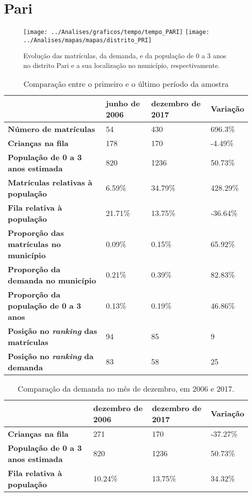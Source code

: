 \section{Pari}
\begin{figure}[H]
\centering
\texttt{[image: ../Analises/graficos/tempo/tempo\_PARI]}
\texttt{[image: ../Analises/mapas/mapas/distrito\_PRI]}
\caption{Evolução das matrículas, da demanda, e da população de 0 a 3 anos no distrito Pari e a sua localização no município, respectivamente.}
\end{figure}
\begin{table}[H]
\begin{tabular}{l|l|l|l}
\textbf{}                                      & \textbf{junho de 2006}       & \textbf{dezembro de 2017}    & \textbf{Variação} \\ \hline
\textbf{Número de matrículas}                  & 54 & 430 & 696.3\% \\ \hline
\textbf{Crianças na fila}                      & 178 & 170 & -4.49\% \\ \hline
\textbf{População de 0 a 3 anos estimada}      & 820 & 1236 & 50.73\% \\ \hline
\textbf{Matrículas relativas à população}      & 6.59\% & 34.79\% & 428.29\% \\ \hline
\textbf{Fila relativa à população}             & 21.71\% & 13.75\% & -36.64\% \\ \hline
\textbf{Proporção das matrículas no município} & 0.09\% & 0.15\% & 65.92\% \\ \hline
\textbf{Proporção da demanda no município}     & 0.21\% & 0.39\% & 82.83\% \\ \hline
\textbf{Proporção da população de 0 a 3 anos}  & 0.13\% & 0.19\% & 46.86\% \\ \hline
\textbf{Posição no \textit{ranking} das matrículas}     & 94 & 85 & 9 \\ \hline
\textbf{Posição no \textit{ranking} da demanda}         & 83 & 58 & 25 \\ 
\end{tabular}
\caption{Comparação entre o primeiro e o último período da amostra}
\end{table}
\begin{table}[H]
\begin{tabular}{l|l|l|l}
\textbf{}                                 & \textbf{dezembro de 2006} & \textbf{dezembro de 2017} & \textbf{Variação} \\ \hline
\textbf{Crianças na fila}                      & 271 & 170 & -37.27\% \\ \hline
\textbf{População de 0 a 3 anos estimada}      & 820 & 1236 & 50.73\% \\ \hline
\textbf{Fila relativa à população}             & 10.24\% & 13.75\% & 34.32\% \\
\end{tabular}
\caption{Comparação da demanda no mês de dezembro, em 2006 e 2017.}
\end{table}
